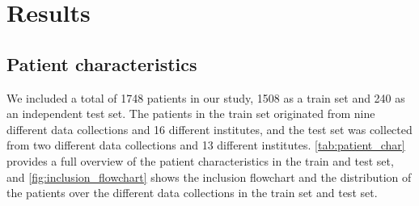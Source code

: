 \newpage

\section{Results}
\subsection{Patient characteristics}
We included a total of 1748 patients in our study, 1508 as a train set and 240 as an independent test set.
The patients in the train set originated from nine different data collections and 16 different institutes, and the test set was collected from two different data collections and 13 different institutes.
\cref{tab:patient_char} provides a full overview of the patient characteristics in the train and test set, and \cref{fig:inclusion_flowchart} shows the inclusion flowchart and the distribution of the patients over the different data collections in the train set and test set.

